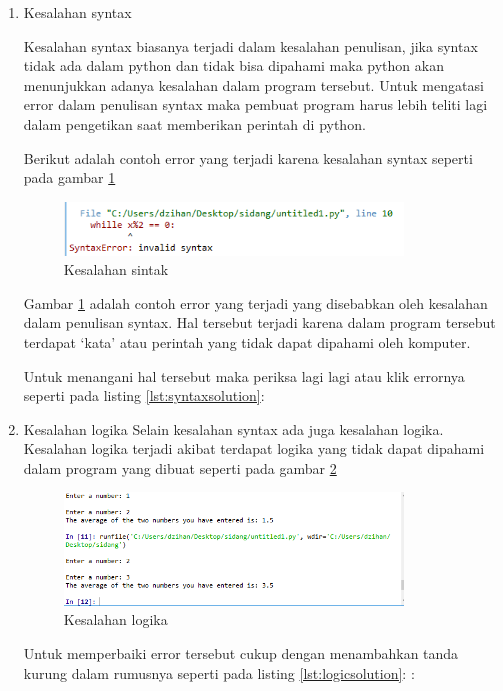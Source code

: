\begin{enumerate}
\item Kesalahan syntax

Kesalahan syntax biasanya terjadi dalam kesalahan penulisan, jika syntax tidak ada dalam python dan tidak bisa dipahami maka python akan menunjukkan adanya kesalahan dalam program tersebut. Untuk mengatasi error dalam penulisan syntax maka pembuat program harus lebih teliti lagi dalam pengetikan saat memberikan perintah di python.

Berikut adalah contoh error yang terjadi karena kesalahan syntax seperti pada gambar \ref{fig:salahsintak}
\begin{figure}[!htbp]
	\centerline{\includegraphics[width=0.85\textwidth]{figures/3/salahsintak.PNG}}
	\caption{Kesalahan sintak}
	\label{fig:salahsintak}
\end{figure}
	
Gambar \ref{fig:salahsintak} adalah contoh error yang terjadi yang disebabkan oleh kesalahan dalam penulisan syntax. Hal tersebut terjadi karena dalam program tersebut terdapat ‘kata’ atau perintah yang tidak dapat dipahami oleh komputer.

Untuk menangani hal tersebut maka periksa lagi lagi atau klik errornya seperti pada listing \ref{lst:syntaxsolution}:


\item Kesalahan logika
Selain kesalahan syntax ada juga kesalahan logika. Kesalahan logika terjadi akibat terdapat logika yang tidak dapat dipahami dalam program yang dibuat seperti pada gambar \ref{fig:salahlogika}
\begin{figure}[!htbp]
	\centerline{\includegraphics[width=0.85\textwidth]{figures/3/salahlogika.PNG}}
	\caption{Kesalahan logika}
	\label{fig:salahlogika}
\end{figure}

Untuk memperbaiki error tersebut cukup dengan menambahkan tanda kurung dalam rumusnya seperti pada listing \ref{lst:logicsolution}:
:
\end{enumerate}

